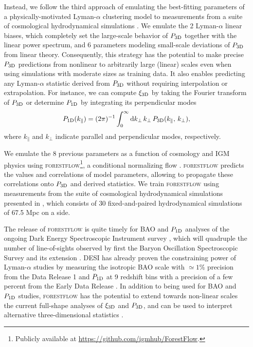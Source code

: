 \documentclass[fleqn,usenatbib]{mnras}
\newcommand{\lya}{Lyman-$\alpha$\xspace}
\newcommand{\poned}{\ensuremath{P_{\rm 1D}}\xspace}
\newcommand{\xithreed}{\ensuremath{\xi_{\rm 3D}}\xspace}
\newcommand{\pthreed}{\ensuremath{P_{\rm 3D}}\xspace}
\newcommand{\forestflow}{\textsc{forestflow}\xspace}
\begin{document}
Instead, we follow the third approach of emulating the best-fitting parameters of a physically-motivated \lya clustering model to measurements from a suite of cosmological hydrodynamical simulations \citep[see][]{mcdonald2003MeasurementCosmologicalGeometry, arinyo-i-prats2015NonlinearPowerSpectrum}. We emulate the 2 \lya linear biases, which completely set the large-scale behavior of \pthreed together with the linear power spectrum, and 6 parameters modeling small-scale deviations of \pthreed from linear theory. Consequently, this strategy has the potential to make precise \pthreed predictions from nonlinear to arbitrarily large (linear) scales even when using simulations with moderate sizes as training data. It also enables predicting any \lya statistic derived from \pthreed without requiring interpolation or extrapolation. For instance, we can compute \xithreed by taking the Fourier transform of \pthreed or determine \poned by integrating its perpendicular modes
%
\begin{equation}
    \label{eq:p1d}
    \poned(k_\parallel)=(2\upi)^{-1}\int_0^\infty \mathrm{d} k_\perp\, k_\perp\, \pthreed(k_\parallel,\, k_\perp),
\end{equation}
%
where $k_\parallel$ and $k_\perp$ indicate parallel and perpendicular modes, respectively.

We emulate the 8 previous parameters as a function of cosmology and IGM physics using \forestflow\footnote{Publicly available at \url{https://github.com/igmhub/ForestFlow}.}, a conditional normalizing flow \citep[cNFs;][]{Winkler2019, cNF_Papamakarios}. \forestflow predicts the values and correlations of model parameters, allowing to propagate these correlations onto \pthreed and derived statistics. We train \forestflow using measurements from the suite of cosmological hydrodynamical simulations presented in \citet{Pedersen2021}, which consists of 30 fixed-and-paired hydrodynamical simulations of 67.5 Mpc on a side.

The release of \forestflow is quite timely for BAO and \poned analyses of the ongoing Dark Energy Spectroscopic Instrument survey \citep[DESI;][]{DESI_collab2016}, which will quadruple the number of line-of-sights observed by first the Baryon Oscillation Spectroscopic Survey \citep[BOSS;][]{boss_dawson2013} and its extension \citep[eBOSS;][]{eboss_dawson2016}. DESI has already proven the constraining power of \lya studies by measuring the isotropic BAO scale with $\simeq1\%$ precision from the Data Release 1 \citep{desicollaboration2024DESI2024IV} and \poned at 9 redshift bins with a precision of a few percent from the Early Data Release \citep{ravoux2023DarkEnergySpectroscopica, karacayli2024Optimal1DLy}. In addition to being used for BAO and \poned studies, \forestflow has the potential to extend towards non-linear scales the current full-shape analyses of \xithreed \citep{cuceu2023ConstraintsCosmicExpansion, 2023MNRAS.518.2567G} and \pthreed \citep{fontribera2018HowEstimate3D, Belsunce2024eBOSS, Horowitz2024}, and can be used to interpret alternative three-dimensional statistics \citep{hui1999GeometricalTestCosmological, fontribera2018HowEstimate3D, Karim2023}.
\end{document}
